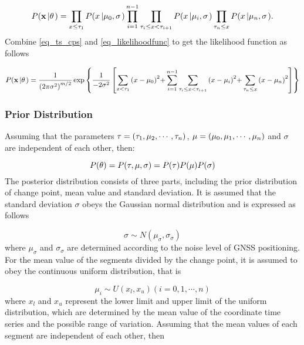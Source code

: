 \documentclass{svjour3}                     %
\begin{document}
\begin{equation}\label{eq_likelihoodfunc}
P({\bf{x}}\left| {\bf{\theta }} \right.) = \prod\limits_{x \le {\tau _1}} {P(x\left| {{\mu_0},\sigma } \right.)} \prod\limits_{i = 1}^{n - 1} {\prod\limits_{{\tau _i} \le x < {\tau _{i + 1}}} {P(x\left| {{\mu_i},\sigma } \right.)} \prod\limits_{{\tau _n} \le x} {P(x\left| {{\mu_n},\sigma } \right.)} }.
\end{equation}
Combine \ref{eq_ts_cps} and \ref{eq_likelihoodfunc} to get the likelihood function as follows

\begin{equation}\label{eq_likelihoodfunc_detail}
P({\bf{x}}\left| {\bf{\theta }} \right.) = \frac{1}{{{{(2\pi {\sigma ^2})}^{m/2}}}}\exp \left\{ {\frac{1}{{ - 2{\sigma ^2}}}\left[ {\sum\limits_{x < {\tau _1}} {{{(x - {\mu_0})}^2}} {\rm{ + }}\sum\limits_{i = 1}^{n - 1} {\sum\limits_{{\tau _i} \le x < {\tau _{i + 1}}} {{{(x - {\mu_i})}^2}} } {\rm{ + }}\sum\limits_{{\tau _n} \le x} {{{(x - {\mu_n})}^2}} } \right]} \right\}
\end{equation}

\subsubsection{Prior Distribution}
Assuming that the parameters ${\bf{\tau }}=(\tau_1,\mu_2,\cdots,\tau_n)$, ${\bf{\mu }}=(\mu_0,\mu_1,\cdots,\mu_n)$ and $\sigma$ are independent of each other, then:

\begin{equation}\label{eq_bayesian_prior}
P({\bf{\theta }}) = P({\bf{\tau }},{\bf{\mu }},\sigma ) = P({\bf{\tau }})P({\bf{\mu }})P(\sigma )
\end{equation}
The posterior distribution consists of three parts, including the prior distribution of change point, mean value and standard deviation. It is assumed that the standard deviation $\sigma$ obeys the Gaussian normal distribution and is expressed as follows

\begin{equation}\label{eq_bayesian_prior_sigma}
\sigma  \sim N({\mu _\sigma },{\sigma _\sigma })
\end{equation}
where $\mu_{\sigma}$ and $\sigma_{\sigma}$ are determined according to the noise level of GNSS positioning.
For the mean value of the segments divided by the change point, it is assumed to obey the continuous uniform distribution, that is

\begin{equation}\label{eq_bayesian_prior_mu}
{\mu _i} \sim U({x_l },{x_u })(i = 0,1, \cdots ,n)
\end{equation}
where $x_l$ and $x_u$ represent the lower limit and  upper limit of the uniform distribution, which are determined by the mean value of the coordinate time series and the possible range of variation. Assuming that the mean values of each segment are independent of each other, then
\end{document}

